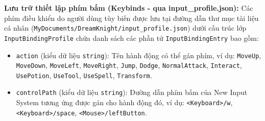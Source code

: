 \documentclass[../DoAn.tex]{subfiles}
\begin{document}
\textbf{Lưu trữ thiết lập phím bấm (Keybinds - qua input\_profile.json):}
Các phím điều khiển do người dùng tùy biến được lưu tại đường dẫn thư mục tài liệu cá nhân (\texttt{MyDocuments/DreamKnight/input\_profile.json}) dưới cấu trúc lớp \texttt{InputBindingProfile} chứa danh sách các phần tử \texttt{InputBindingEntry} bao gồm:
\begin{itemize}
    \item \texttt{action} (kiểu dữ liệu \texttt{string}): Tên hành động có thể gán phím, ví dụ: \texttt{MoveUp}, \texttt{MoveDown}, \texttt{MoveLeft}, \texttt{MoveRight}, \texttt{Jump}, \texttt{Dodge}, \texttt{NormalAttack}, \texttt{Interact}, \texttt{UsePotion}, \texttt{UseTool}, \texttt{UseSpell}, \texttt{Transform}.
    \item \texttt{controlPath} (kiểu dữ liệu \texttt{string}): Đường dẫn phím bấm của New Input System tương ứng được gán cho hành động đó, ví dụ: \texttt{<Keyboard>/w}, \texttt{<Keyboard>/space}, \texttt{<Mouse>/leftButton}.
\end{itemize}
\end{document}
